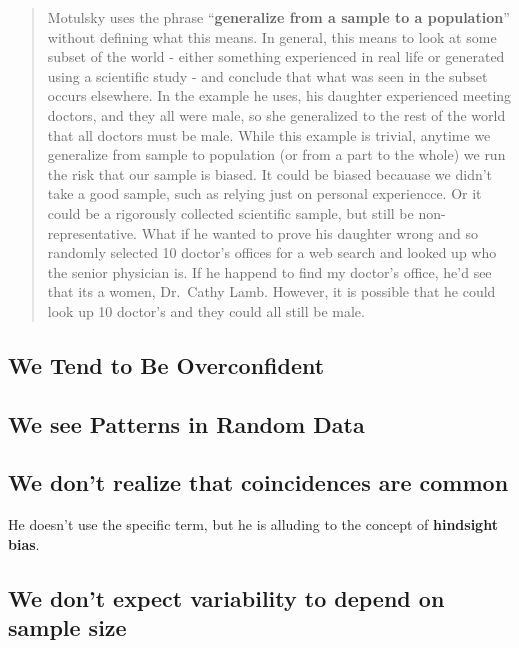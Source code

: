 \documentclass[]{book}
\theoremstyle{definition}
\theoremstyle{definition}
\theoremstyle{definition}
\theoremstyle{remark}
\begin{document}
\begin{quote}
Motulsky uses the phrase ``\textbf{generalize from a sample to a
population}'' without defining what this means. In general, this means
to look at some subset of the world - either something experienced in
real life or generated using a scientific study - and conclude that what
was seen in the subset occurs elsewhere. In the example he uses, his
daughter experienced meeting doctors, and they all were male, so she
generalized to the rest of the world that all doctors must be male.
While this example is trivial, anytime we generalize from sample to
population (or from a part to the whole) we run the risk that our sample
is biased. It could be biased becauase we didn't take a good sample,
such as relying just on personal experiencce. Or it could be a
rigorously collected scientific sample, but still be non-representative.
What if he wanted to prove his daughter wrong and so randomly selected
10 doctor's offices for a web search and looked up who the senior
physician is. If he happend to find my doctor's office, he'd see that
its a women, Dr.~Cathy Lamb. However, it is possible that he could look
up 10 doctor's and they could all still be male.
\end{quote}

\subsection{We Tend to Be
Overconfident}\label{we-tend-to-be-overconfident}

\subsection{We see Patterns in Random
Data}\label{we-see-patterns-in-random-data}

\subsection{We don't realize that coincidences are
common}\label{we-dont-realize-that-coincidences-are-common}

He doesn't use the specific term, but he is alluding to the concept of
\textbf{hindsight bias}.

\subsection{We don't expect variability to depend on sample
size}\label{we-dont-expect-variability-to-depend-on-sample-size}
\end{document}
